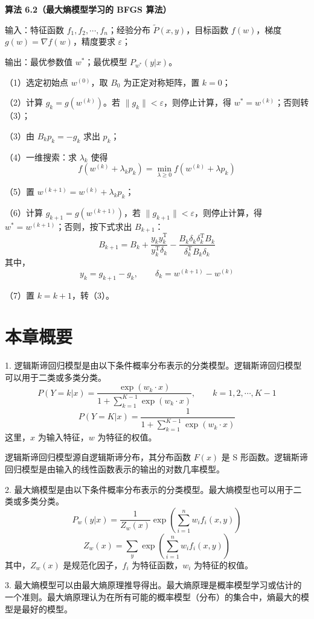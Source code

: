 \documentclass[UTF8,12pt,a4paper,fontset=fandol]{ctexart}
\begin{document}
\noindent\textbf{算法 6.2（最大熵模型学习的 BFGS 算法）}\quad

输入：特征函数 $f_1,f_2,\cdots,f_n$；经验分布 $\tilde{P}(x,y)$，目标函数 $f(w)$，梯度 $g(w)=\nabla f(w)$，精度要求 $\varepsilon$；

输出：最优参数值 $w^*$；最优模型 $P_{w^*}(y|x)$。

（1）选定初始点 $w^{(0)}$，取 $B_0$ 为正定对称矩阵，置 $k=0$；

（2）计算 $g_k=g(w^{(k)})$。若 $\|g_k\|<\varepsilon$，则停止计算，得 $w^*=w^{(k)}$；否则转（3）；

（3）由 $B_k p_k=-g_k$ 求出 $p_k$；

（4）一维搜索：求 $\lambda_k$ 使得
\[
f(w^{(k)}+\lambda_k p_k)=\min_{\lambda\geq 0} f(w^{(k)}+\lambda p_k)
\]

（5）置 $w^{(k+1)}=w^{(k)}+\lambda_k p_k$；

（6）计算 $g_{k+1}=g(w^{(k+1)})$，若 $\|g_{k+1}\|<\varepsilon$，则停止计算，得 $w^*=w^{(k+1)}$；否则，按下式求出 $B_{k+1}$：
\[
B_{k+1}=B_k+\frac{y_k y_k^{\mathrm{T}}}{y_k^{\mathrm{T}}\delta_k}
-\frac{B_k\delta_k\delta_k^{\mathrm{T}}B_k}{\delta_k^{\mathrm{T}}B_k\delta_k}
\]
其中，
\[
y_k=g_{k+1}-g_k,\qquad \delta_k=w^{(k+1)}-w^{(k)}
\]

（7）置 $k=k+1$，转（3）。

\section*{本章概要}

1. 逻辑斯谛回归模型是由以下条件概率分布表示的分类模型。逻辑斯谛回归模型可以用于二类或多类分类。
\[
P(Y=k|x)=\frac{\exp(w_k\cdot x)}
{1+\sum_{k=1}^{K-1}\exp(w_k\cdot x)},\qquad k=1,2,\cdots,K-1
\]
\[
P(Y=K|x)=\frac{1}{1+\sum_{k=1}^{K-1}\exp(w_k\cdot x)}
\]
这里，$x$ 为输入特征，$w$ 为特征的权值。

逻辑斯谛回归模型源自逻辑斯谛分布，其分布函数 $F(x)$ 是 S 形函数。逻辑斯谛回归模型是由输入的线性函数表示的输出的对数几率模型。

2. 最大熵模型是由以下条件概率分布表示的分类模型。最大熵模型也可以用于二类或多类分类。
\[
P_w(y|x)=\frac{1}{Z_w(x)}\exp\left(\sum_{i=1}^n w_i f_i(x,y)\right)
\]
\[
Z_w(x)=\sum_y\exp\left(\sum_{i=1}^n w_i f_i(x,y)\right)
\]
其中，$Z_w(x)$ 是规范化因子，$f_i$ 为特征函数，$w_i$ 为特征的权值。

3. 最大熵模型可以由最大熵原理推导得出。最大熵原理是概率模型学习或估计的一个准则。最大熵原理认为在所有可能的概率模型（分布）的集合中，熵最大的模型是最好的模型。
\end{document}
